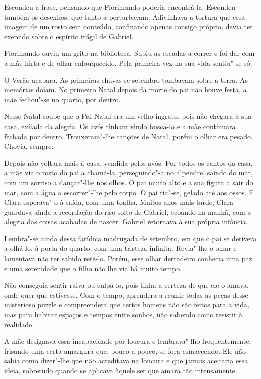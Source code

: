 Escondeu a frase, pensando que Florimundo poderia encontrá-la. Escondeu
também os desenhos, que tanto a perturbavam. Adivinhava a tortura que
essa imagem de um rosto sem conteúdo, confinando apenas consigo próprio,
devia ter exercido sobre o espírito frágil de Gabriel.

Florimundo ouviu um grito na biblioteca. Subiu as escadas a correr e foi
dar com a mãe hirta e de olhar enlouquecido. Pela primeira vez na sua
vida sentiu"-se só.

O Verão acabara. As primeiras chuvas se setembro tombavam sobre a terra.
As memórias doíam. No primeiro Natal depois da morte do pai não houve
festa, a mãe fechou"-se no quarto, por dentro.

Nesse Natal soube que o Pai Natal era um velho ingrato, pois não chegara
à sua casa, exilada da alegria. Os avós tinham vindo buscá-lo e a mãe
continuara fechada por dentro. Trouxeram"-lhe canções de Natal, porém o
olhar era pesado. Chovia, sempre.

Depois não voltara mais à casa, vendida pelos avós. Por todos os cantos
da casa, a mãe via o rosto do pai a chamá-la, perseguindo"-a no alpendre,
saindo do mar, com um sorriso a dançar"-lhe nos olhos. O pai muito alto e
a sua figura a sair do mar, com a água a escorrer"-lhe pelo corpo. O pai
ria"-se, gelado até aos ossos. E Clara esperava"-o à saída, com uma
toalha. Muitos anos mais tarde, Clara guardava ainda a recordação do
riso solto de Gabriel, ecoando na manhã, com a alegria das coisas
acabadas de nascer. Gabriel retornava à sua própria infância.

Lembra"-se ainda dessa fatídica madrugada de setembro, em que o pai se
detivera a olhá-lo, à porta do quarto, com uma tristeza infinita.
Revia"-lhe o olhar e lamentava não ter sabido retê-lo. Porém, esse olhar
derradeiro conhecia uma paz e uma serenidade que o filho não lhe via há
muito tempo.

Não conseguia sentir raiva ou culpá-lo, pois tinha a certeza de que ele
o amava, onde quer que estivesse. Com o tempo, aprendera a reunir todas
as peças desse misterioso puzzle e compreendera que certos homens não
são feitos para a vida, mas para habitar espaços e tempos entre sonhos,
não sabendo como resistir à realidade.

A mãe designava essa incapacidade por loucura e lembrava"-lho
frequentemente, frisando uma certa amargura que, pouco a pouco, se fora
esmaecendo. Ele não sabia como dizer"-lhe que não acreditava na loucura e
que jamais aceitaria essa ideia, sobretudo quando se aplicava àquele ser
que amara tão intensamente.

